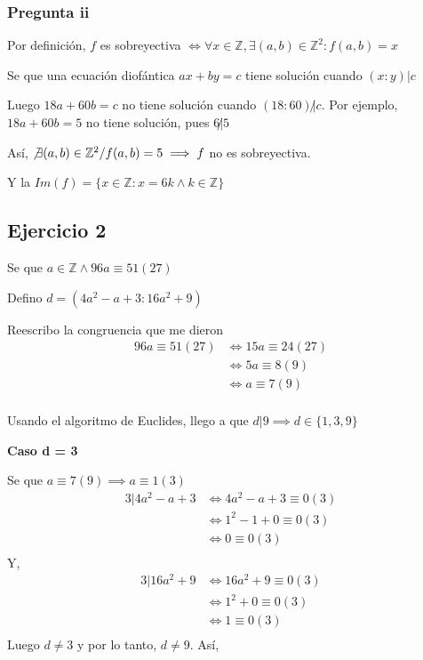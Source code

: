 \subsubsection{Pregunta ii}

Por definición, $ f $ es sobreyectiva $ \iff \forall x\in \mathbb{Z}, \exists(a,b) \in \mathbb{Z}^2: f(a,b) = x $

Se que una ecuación diofántica $ ax+by = c $ tiene solución cuando $ (x:y) | c $

Luego $ 18a+60b = c $ no tiene solución cuando $ (18:60) \not | c $. Por ejemplo, $ 18a+60b = 5 $ no tiene solución, pues $ 6 \not | 5 $

Así, $ \not \exists (a,b) \in \mathbb{Z}^2 / f(a,b) = 5 \implies f $ no es sobreyectiva. 

Y la $ Im(f) = \{ x \in \mathbb{Z}: x = 6k \wedge k \in \mathbb{Z} \} $

\subsection{Ejercicio 2}

Se que $ a \in \mathbb{Z} \wedge 96a \equiv 51(27) $

Defino $ d = (4a^2-a+3:16a^2+9) $

Reescribo la congruencia que me dieron
\begin{align*}
    96a \equiv 51(27) &\iff 15a \equiv 24(27) \\
    &\iff 5a \equiv 8(9) \\
    &\iff a \equiv 7(9) \\
\end{align*}

Usando el algoritmo de Euclides, llego a que $ d|9 \implies d \in \{ 1,3,9 \} $

\textbf{Caso d = 3}

Se que $ a \equiv 7(9) \implies a \equiv 1(3) $
\begin{align*}
    3 | 4a^2-a+3 &\iff 4a^2-a+3 \equiv 0 (3) \\
    &\iff 1^2-1+0 \equiv 0 (3) \\
    &\iff 0 \equiv 0 (3) \\
\end{align*}
Y,
\begin{align*}
    3 | 16a^2 + 9 &\iff 16a^2 + 9 \equiv 0 (3) \\
    &\iff 1^2 + 0 \equiv 0 (3) \\
    &\iff 1 \equiv 0 (3) \\
\end{align*}
Luego $ d \neq 3 $ y por lo tanto, $ d \neq 9 $. Así,

